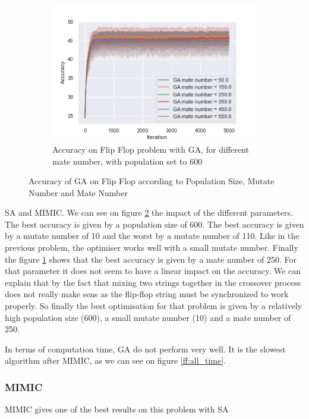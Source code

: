 \documentclass[twocolumn, 10pt]{article}
\begin{document}
\begin{figure}[h]
\begin{subfigure}[t]{0.32\columnwidth}
						\centering
						\includegraphics[width=\linewidth]{../graphics/flip_flop_GA_Iteration_Error_GA_mate_number.png}
						\caption{Accuracy on Flip Flop problem with GA, for different mate number, with population set to 600}
						\label{ff:ga_mate}
					\end{subfigure}
					\caption{Accuracy of GA on Flip Flop according to Population Size, Mutate Number and Mate Number}
					\label{ff:ga}
				\end{figure}

				SA and MIMIC. We can see on figure \ref{ff:ga} the impact of the different parameters.
				The best accuracy is given by a population size of 600. The best accuracy is given by a mutate number of 10 and the worst by a mutate number of 110. Like in the previous problem, the optimiser works well with a small mutate number. Finally the figure \ref{ff:ga_mate} shows that the best accuracy is given by a mate number of 250. For that parameter it does not seem to have a linear impact on the accuracy. We can explain that by the fact that mixing two strings together in the crossover process does not really make sens as the flip-flop string must be synchronized to work properly. So finally the best optimisation for that problem is given by a relatively high population size (600), a small mutate number (10) and a mate number of 250.

				In terms of computation time, GA do not perform very well. It is the slowest algorithm after MIMIC, as we can see on figure \ref{ff:all_time}.
			\subsubsection*{MIMIC}
				MIMIC gives one of the best results on this problem with SA
\end{document}
